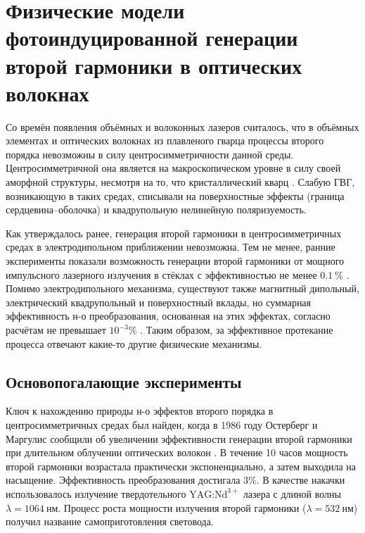 \section{Физические модели фотоиндуцированной генерации второй гармоники в оптических волокнах}\label{sec:chFiber3/fibershg}
Со времён появления объёмных и волоконных лазеров считалось, что в объёмных элементах и оптических волокнах из плавленого гварца процессы второго порядка невозможны в силу центросимметричности данной среды. Центросимметричной она является на макроскопическом уровне в силу своей аморфной структуры, несмотря на то, что кристаллический кварц . Слабую ГВГ, возникающую в таких средах, списывали на поверхностные эффекты (граница сердцевина--оболочка) и квадрупольную нелинейную поляризуемость.

Как утверждалось ранее, генерация второй гармоники в центросимметричных средах в электродипольном приближении невозможна. Тем не менее, ранние эксперименты показали возможность генерации второй гармоники от мощного импульсного лазерного излучения в стёклах с эффективностью не менее $0.1~\%$ \cite{sasaki1981phase}.  Помимо электродипольного механизма, существуют также магнитный дипольный, электрический квадрупольный и поверхностный вклады, но суммарная эффективность н-о преобразования, основанная на этих эффектах, согласно расчётам не превышает $10^{-3}\%$ \cite{terhune1987second}. Таким образом, за эффективное протекание процесса отвечают какие-то другие физические механизмы.

\subsection{Основопогалающие эксперименты}
Ключ к нахождению природы н-о эффектов второго порядка в центросимметричных средах был найден, когда в 1986 году Остерберг и Маргулис сообщили об увеличении эффективности генерации второй гармоники \textsf{при длительном облучении} оптических волокон \cite{osterberg1986dye}. В течение 10 часов мощность второй гармоники возрастала практически экспоненциально, а затем выходила на насыщение. Эффективность преобразования достигала $3 \%$. В качестве накачки использовалось излучение твердотельного $\text{YAG:Nd}^{3+}$ лазера с длиной волны $\lambda = 1064~\text{нм}$. Процесс роста мощности излучения второй гармоники ($\lambda = 532~\text{нм}$) получил название самоприготовления световода.

